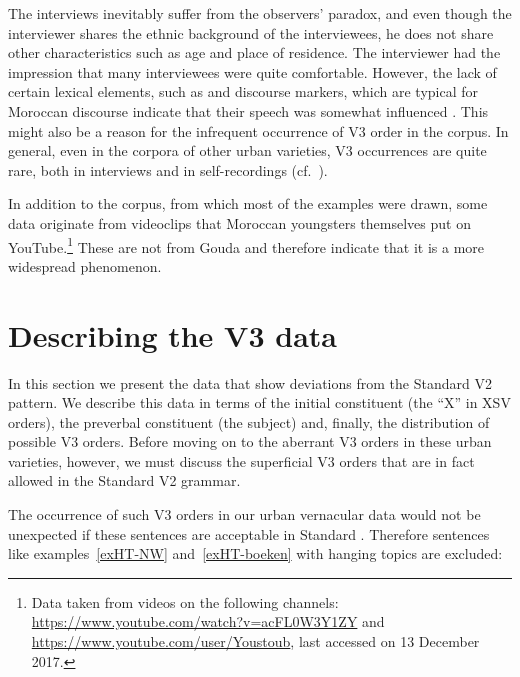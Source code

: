 \documentclass[output=paper]{langsci/langscibook}
\begin{document}
The interviews inevitably suffer from the observers' paradox, and even though
the interviewer shares the ethnic background of the interviewees, he does not
share other characteristics such as age and place of residence. The interviewer
had the impression that many interviewees were quite comfortable. However, the
lack of certain lexical elements, such as  and 
discourse markers, which are typical for Moroccan  discourse
indicate that their speech was somewhat influenced \citep{Kossmann:fc}. This
might also be a reason for the infrequent occurrence of V3
order in the corpus. In general, even in the corpora of other 
urban varieties, V3 occurrences are quite rare, both in
interviews and in self-recordings (cf.\ \citealt{Ganuza:2008}).

In addition to the corpus, from which most of the examples were drawn, some
data originate from videoclips that Moroccan  youngsters themselves put on
YouTube.\footnote{Data taken from videos on the following channels:
    \url{https://www.youtube.com/watch?v=acFL0W3Y1ZY} and
\url{https://www.youtube.com/user/Youstoub}, last accessed on 13 December
2017.} These are not from Gouda and therefore indicate that it is a more
widespread phenomenon.

\section{Describing the V3 data}
\label{sec:data}

\noindent In this section we present the data that show deviations from the
Standard  V2 pattern. We describe this data in terms of the initial
constituent (the \enquote{X} in XSV orders), the preverbal constituent (the
subject) and, finally, the distribution of possible V3 orders. Before moving on
to the aberrant V3 orders in these urban varieties, however, we must discuss
the superficial V3 orders that are in fact allowed in the Standard  V2
grammar.

The occurrence of such V3 orders in our urban vernacular data would not be
unexpected if these sentences are acceptable in Standard . Therefore
sentences like examples~\eqref{exHT-NW} and~\eqref{exHT-boeken} with hanging
topics are excluded:
\end{document}
